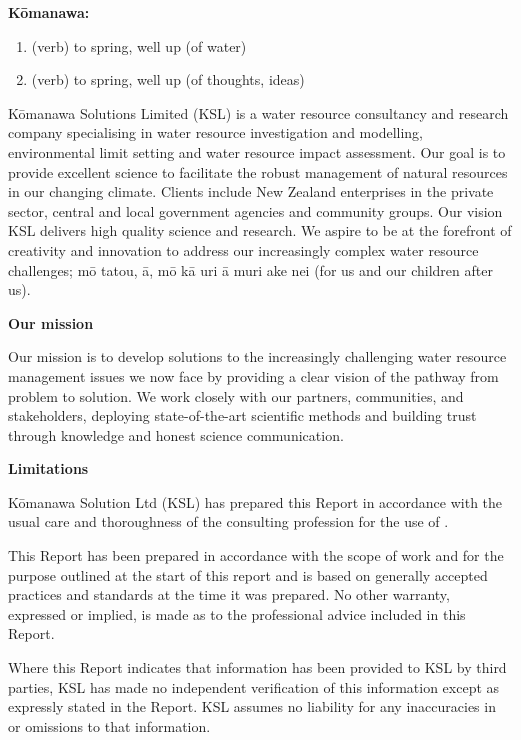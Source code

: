 
\color{ksldarkblue} \LARGE \textbf{Kōmanawa:}
\color{black} \large
\begin{enumerate}
    \item (verb) to spring, well up (of water)
    \item (verb) to spring, well up (of thoughts, ideas)
\end{enumerate}
\normalsize

Kōmanawa Solutions Limited (KSL) is a water resource consultancy and research company specialising in water resource investigation and modelling, environmental limit setting and water resource impact assessment. Our goal is to provide excellent science to facilitate the robust management of natural resources in our changing climate. Clients include New Zealand enterprises in the private sector, central and local government agencies and community groups.
Our vision
KSL delivers high quality science and research. We aspire to be at the forefront of creativity and innovation to address our increasingly complex water resource challenges; mō tatou, ā, mō kā uri ā muri ake nei (for us and our children after us).

\color{ksldarkblue} \LARGE \textbf{Our mission}
\color{black} \normalsize

Our mission is to develop solutions to the increasingly challenging water resource management issues we now face by providing a clear vision of the pathway from problem to solution. We work closely with our partners, communities, and stakeholders, deploying state-of-the-art scientific methods and building trust through knowledge and honest science communication.

\color{ksldarkblue} \LARGE \textbf{Limitations}
\color{black} \normalsize

Kōmanawa Solution Ltd (KSL) has prepared this Report in accordance with the usual care and thoroughness of the consulting profession for the use of \client{}.

This Report has been prepared in accordance with the scope of work and for the purpose outlined at the start of this report and is based on generally accepted practices and standards at the time it was prepared. No other warranty, expressed or implied, is made as to the professional advice included in this Report.

Where this Report indicates that information has been provided to KSL by third parties, KSL has made no independent verification of this information except as expressly stated in the Report. KSL assumes no liability for any inaccuracies in or omissions to that information.


